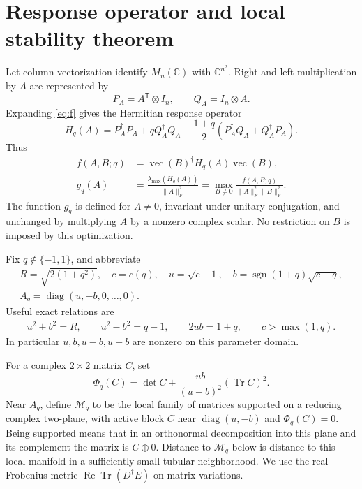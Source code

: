 \documentclass[11pt,a4paper]{article}
\newcommand{\Tr}{\operatorname{Tr}}
\newcommand{\diag}{\operatorname{diag}}
\newcommand{\vecop}{\operatorname{vec}}
\newcommand{\norm}[1]{\lVert #1\rVert_F}
\newcommand{\Mq}{\mathcal M_q}
\begin{document}
\section{Response operator and local stability theorem}
Let column vectorization identify \(M_n(\mathbb C)\) with
\(\mathbb C^{n^2}\). Right and left multiplication by \(A\) are
represented by
\begin{equation}
 P_A=A^{\mathsf T}\otimes I_n,\qquad Q_A=I_n\otimes A.
\end{equation}
Expanding \eqref{eq:f} gives the Hermitian response operator
\begin{equation}
 H_q(A)=P_A^\dagger P_A+qQ_A^\dagger Q_A
       -\frac{1+q}{2}(P_A^\dagger Q_A+Q_A^\dagger P_A).
 \label{eq:H}
\end{equation}
Thus
\begin{equation}
 \begin{aligned}
 f(A,B;q)&=\vecop(B)^\dagger H_q(A)\vecop(B),\\
 g_q(A)&=\frac{\lambda_{\max}(H_q(A))}{\norm{A}^2}
       =\max_{B\neq0}\frac{f(A,B;q)}{\norm{A}^2\norm{B}^2}.
 \end{aligned}
 \label{eq:g}
\end{equation}
The function \(g_q\) is defined for \(A\neq0\), invariant under unitary
conjugation, and unchanged by multiplying \(A\) by a nonzero complex
scalar. No restriction on \(B\) is imposed by this optimization.

Fix \(q\notin\{-1,1\}\), and abbreviate
\begin{equation}
 \begin{gathered}
 R=\sqrt{2(1+q^2)},\quad c=c(q),\quad
 u=\sqrt{c-1},\quad b=\operatorname{sgn}(1+q)\sqrt{c-q},\\
 A_q=\diag(u,-b,0,\ldots,0).
 \end{gathered}
 \label{eq:params}
\end{equation}
Useful exact relations are
\begin{equation}
 \begin{gathered}
 u^2+b^2=R,\qquad u^2-b^2=q-1,\qquad
 2ub=1+q,\qquad c>\max(1,q).
 \end{gathered}
 \label{eq:relations}
\end{equation}
In particular \(u,b,u-b,u+b\) are nonzero on this parameter domain.

For a complex \(2\times2\) matrix \(C\), set
\begin{equation}
 \Phi_q(C)=\det C+\frac{ub}{(u-b)^2}(\Tr C)^2.
 \label{eq:Phi}
\end{equation}
Near \(A_q\), define \(\Mq\) to be the local family of matrices
supported on a reducing complex two-plane, with active block \(C\)
near \(\diag(u,-b)\) and \(\Phi_q(C)=0\).
Being supported means that in an orthonormal decomposition into this
plane and its complement the matrix is \(C\oplus0\).
Distance to \(\Mq\) below is distance to this local manifold in
a sufficiently small tubular neighborhood.
We use the real Frobenius metric
\(\operatorname{Re}\Tr(D^\dagger E)\) on matrix variations.
\end{document}
